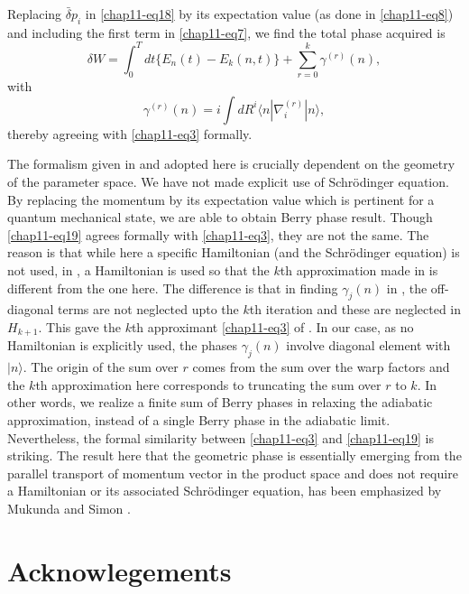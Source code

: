 Replacing $\bar{\delta}p_i$ in \eqref{chap11-eq18} by its expectation value (as done in \eqref{chap11-eq8}) and including the first term in \eqref{chap11-eq7}, we  find the total phase acquired is 
\begin{equation}
\delta W=  \int_0^T dt\{E_n(t)-E_k(n,t)\} +\sum_{r=0}^k{\gamma}^{(r)}(n), \label{chap11-eq19}
\end{equation}
with
\begin{equation}
{\gamma}^{(r)}(n)= i\int dR^i\langle n|{\nabla}^{(r)}_i|n\rangle,\label{chap11-eq20}
\end{equation}
thereby agreeing with \eqref{chap11-eq3} formally.    

The formalism given in \cite{chap11-key6, chap11-key7} and adopted here is crucially dependent on the geometry of the parameter space. We have  not made explicit use of Schr\"{o}dinger equation. By replacing the momentum by its expectation value which is pertinent  for a quantum mechanical state, we are able to obtain Berry phase result. Though \eqref{chap11-eq19} agrees formally with \eqref{chap11-eq3}, they are  not the same. The reason is that while here a specific Hamiltonian (and the Schr\"{o}dinger equation) is not used, in \cite{chap11-key5}, a  Hamiltonian is used so that the $k$th approximation made in \cite{chap11-key5} is different from the one here. The difference is that in  finding ${\gamma}_j(n)$ in \cite{chap11-key5}, the off-diagonal terms are not neglected upto the $k$th iteration and these are  neglected in $H_{k+1}$. This gave the $k$th approximant \eqref{chap11-eq3} of \cite{chap11-key5}. In our case, as no Hamiltonian is explicitly used,  the phases ${\gamma}_j(n)$ involve diagonal element with $|n\rangle$. The origin of the sum over $r$ comes from the  sum over the warp factors and the $k$th approximation here corresponds to truncating the sum over $r$ to $k$. In other  words, we realize a finite sum of Berry phases in relaxing the adiabatic approximation, instead of a single Berry  phase in the adiabatic limit.   Nevertheless, the formal similarity between \eqref{chap11-eq3} and \eqref{chap11-eq19} is striking. The result here  that the geometric phase is essentially emerging from the parallel transport of momentum vector in the product space  and does not require a Hamiltonian or its associated Schr\"{o}dinger equation, has been emphasized by Mukunda and  Simon \cite{chap11-key8}.   

\section*{Acknowlegements}

